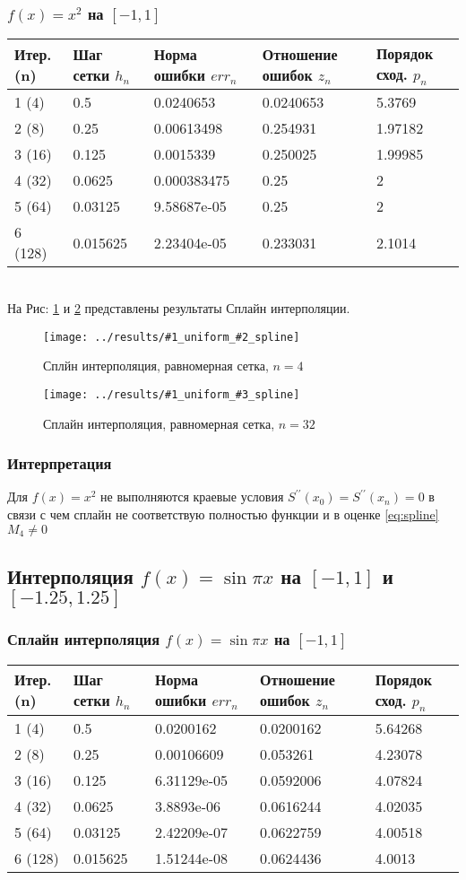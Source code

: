 \documentclass[12pt]{article}
\newcommand{\spline}[3] {
	На Рис:  \ref{fig:#1uniform#2spline} и \ref{fig:#1uniform#3spline} представлены результаты Сплайн интерполяции.
	
	\begin{figure}[H]
		\centering
		\texttt{[image: ../results/\#1\_uniform\_\#2\_spline]}
		\caption{Сплйн интерполяция, равномерная сетка, $n = #2$}
		\label{fig:#1uniform#2spline}
	\end{figure}
	\begin{figure}[H]
		\centering
		\texttt{[image: ../results/\#1\_uniform\_\#3\_spline]}
		\caption{Сплайн интерполяция, равномерная сетка, $n = #3$}
		\label{fig:#1uniform#3spline}
	\end{figure}
}
\begin{document}
\subsubsection{$f(x) = x^2$ на $[-1, 1]$}
\begin{tabular}{|l|l|l|l|l|}
	\hline 
	Итер.(n) & Шаг сетки $h_n$ & Норма ошибки $err_n$ &  Отношение ошибок $z_n$ & Порядок сход. $p_n$ \\ \hline
	1 (4)  & 0.5 & 0.0240653 & 0.0240653 & 5.3769 \\ \hline
	2 (8)  & 0.25 & 0.00613498 & 0.254931 & 1.97182 \\ \hline
	3 (16)  & 0.125 & 0.0015339 & 0.250025 & 1.99985 \\ \hline
	4 (32)  & 0.0625 & 0.000383475 & 0.25 & 2 \\ \hline
	5 (64)  & 0.03125 & 9.58687e-05 & 0.25 & 2 \\ \hline
	6 (128)  & 0.015625 & 2.23404e-05 & 0.233031 & 2.1014 \\ \hline
\end{tabular}\\

\spline{quad}{4}{32}

\subsubsection{Интерпретация}
Для $f(x) = x^2$ не выполняются краевые условия $S^{\prime \prime}\left(x_{0}\right)=S^{\prime \prime}\left(x_{n}\right)=0$ в связи с чем сплайн не соответствую полностью функции и в оценке \ref{eq:spline} $M_4 \neq 0$


\subsection{Интерполяция $f(x) = \sin{\pi x}$ на $[-1, 1]$ и $[-1.25, 1.25]$}
\subsubsection{Сплайн интерполяция $f(x) = \sin{\pi x}$ на $[-1, 1]$}
\begin{tabular}{|l|l|l|l|l|}
	\hline 
	Итер.(n) & Шаг сетки $h_n$ & Норма ошибки $err_n$ &  Отношение ошибок $z_n$ & Порядок сход. $p_n$ \\ \hline
	1 (4)  & 0.5 & 0.0200162 & 0.0200162 & 5.64268 \\ \hline
	2 (8)  & 0.25 & 0.00106609 & 0.053261 & 4.23078 \\ \hline
	3 (16)  & 0.125 & 6.31129e-05 & 0.0592006 & 4.07824 \\ \hline
	4 (32)  & 0.0625 & 3.8893e-06 & 0.0616244 & 4.02035 \\ \hline
	5 (64)  & 0.03125 & 2.42209e-07 & 0.0622759 & 4.00518 \\ \hline
	6 (128)  & 0.015625 & 1.51244e-08 & 0.0624436 & 4.0013 \\ \hline
\end{tabular}\\
\end{document}
